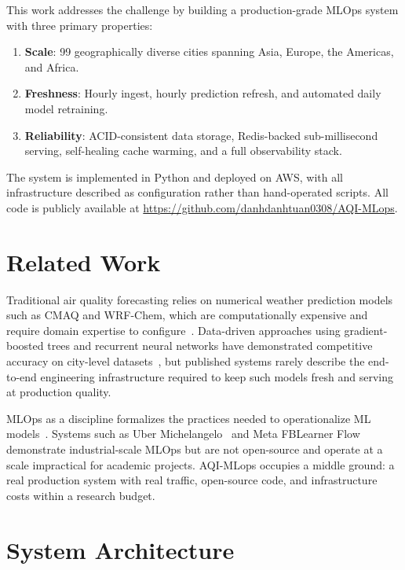 \documentclass[sigconf, nonacm]{acmart}
\begin{document}
This work addresses the challenge by building a
production-grade MLOps system with three primary properties:

\begin{enumerate}
  \item \textbf{Scale}: 99 geographically diverse cities
        spanning Asia, Europe, the Americas, and Africa.
  \item \textbf{Freshness}: Hourly ingest, hourly prediction
        refresh, and automated daily model retraining.
  \item \textbf{Reliability}: ACID-consistent data storage,
        Redis-backed sub-millisecond serving, self-healing
        cache warming, and a full observability stack.
\end{enumerate}

The system is implemented in Python and deployed on AWS, with
all infrastructure described as configuration rather than
hand-operated scripts.  All code is publicly available at
\url{https://github.com/danhdanhtuan0308/AQI-MLops}.

\section{Related Work}

Traditional air quality forecasting relies on numerical
weather prediction models such as CMAQ and WRF-Chem, which
are computationally expensive and require domain expertise
to configure~\cite{cmaq2006}.  Data-driven approaches using
gradient-boosted trees and recurrent neural networks have
demonstrated competitive accuracy on city-level
datasets~\cite{zhao2018,qi2019}, but published systems
rarely describe the end-to-end engineering infrastructure
required to keep such models fresh and serving at production
quality.

MLOps as a discipline formalizes the practices needed to
operationalize ML models~\cite{sculley2015}.  Systems such
as Uber Michelangelo~\cite{michelangelo2017} and Meta
FBLearner Flow~\cite{fblearner2016} demonstrate
industrial-scale MLOps but are not open-source and operate
at a scale impractical for academic projects.  AQI-MLops
occupies a middle ground: a real production system with real
traffic, open-source code, and infrastructure costs within
a research budget.

\section{System Architecture}
\end{document}
